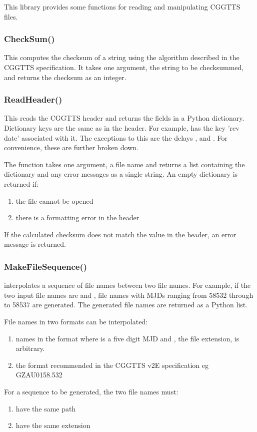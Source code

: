 This library provides some functions for reading and manipulating CGGTTS files.

\subsubsection{CheckSum()}

This computes the checksum of a string using the algorithm described in
the CGGTTS specification. It takes one argument, the string to be checksummed, and
returns the checksum as an integer.

\subsubsection{ReadHeader()}

This reads the CGGTTS header and returns the fields in a Python dictionary.
Dictionary keys are the same as in the header. For example,  
has the key 'rev date' associated with it. The exceptions to this are the delays
,  and . For convenience, these are further
broken down.

The function takes one argument, a file name and returns a list containing
the dictionary and any error messages as a single string. 
An empty dictionary is returned if:
\begin{enumerate}
\item the file cannot be opened
\item there is a formatting error in the header
\end{enumerate}
If the calculated checksum does not match the value in the header, an error message is returned.

\subsubsection{MakeFileSequence()}

 interpolates a sequence of file names between two file names.
For example, if the two input file names are  and ,
file names with MJDs ranging from 58532 through to 58537 are generated. The generated file names are 
returned as a Python list.

File names in two formats can be interpolated:
\begin{enumerate}
\item names in the format  where  is a five digit MJD and , the file extension, is arbitrary.
\item the format recommended in the CGGTTS v2E specification eg GZAU0158.532 
\end{enumerate}

For a sequence to be generated, the two file names must:
\begin{enumerate}
\item have the same path
\item have the same extension
\end{enumerate}
